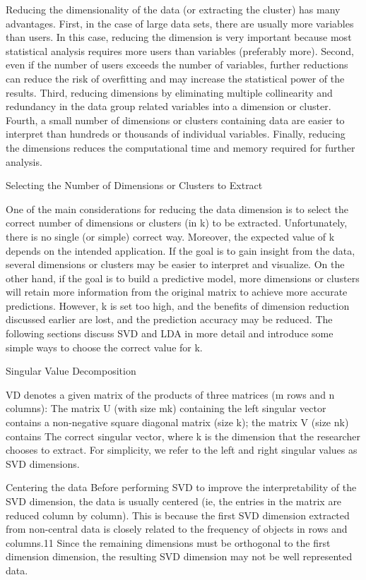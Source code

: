 Reducing the dimensionality of the data (or extracting the cluster)
 has many advantages. First, in the case of large data sets, there
 are usually more variables than users. In this case, reducing the
 dimension is very important because most statistical analysis 
requires more users than variables (preferably more). Second, even
 if the number of users exceeds the number of variables, further 
reductions can reduce the risk of overfitting and may increase the
 statistical power of the results. Third, reducing dimensions by 
eliminating multiple collinearity and redundancy in the data group
 related variables into a dimension or cluster. Fourth, a small 
number of dimensions or clusters containing data are easier to 
interpret than hundreds or thousands of individual variables. 
Finally, reducing the dimensions reduces the computational time and
 memory required for further analysis.

Selecting the Number of Dimensions or Clusters to Extract

One of the main considerations for reducing the data dimension is 
to select the correct number of dimensions or clusters (in k) to be
 extracted. Unfortunately, there is no single (or simple) correct 
way. Moreover, the expected value of k depends on the intended 
application. If the goal is to gain insight from the data, several
 dimensions or clusters may be easier to interpret and visualize. 
On the other hand, if the goal is to build a predictive model, more
 dimensions or clusters will retain more information from the 
original matrix to achieve more accurate predictions. However, k is
 set too high, and the benefits of dimension reduction discussed 
earlier are lost, and the prediction accuracy may be reduced. The 
following sections discuss SVD and LDA in more detail and introduce
 some simple ways to choose the correct value for k.

Singular Value Decomposition

VD denotes a given matrix of the products of three matrices (m rows
 and n columns): The matrix U (with size mk) containing the left 
singular vector contains a non-negative square diagonal matrix 
(size k); the matrix V (size nk) contains The correct singular 
vector, where k is the dimension that the researcher chooses to 
extract. For simplicity, we refer to the left and right singular 
values as SVD dimensions.

Centering the data
Before performing SVD to improve the interpretability of the SVD 
dimension, the data is usually centered (ie, the entries in the 
matrix are reduced column by column). This is because the first SVD
 dimension extracted from non-central data is closely related to 
the frequency of objects in rows and columns.11 Since the remaining
 dimensions must be orthogonal to the first dimension dimension, 
the resulting SVD dimension may not be well represented data.

